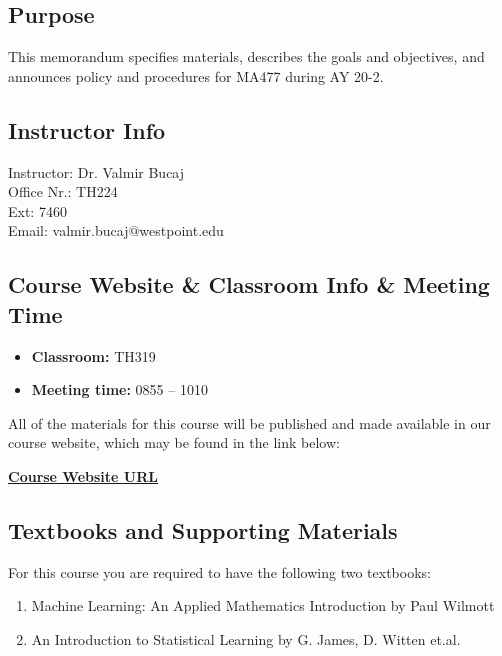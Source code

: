 \documentclass[11pt]{article}
\theoremstyle{plain}
\theoremstyle{definition}
\begin{document}
\subsection{Purpose}

This memorandum specifies materials, describes the goals and objectives, and announces policy and procedures for MA477 during AY 20-2.

\subsection{Instructor Info}

Instructor: Dr. Valmir Bucaj\\
Office Nr.: TH224\\
Ext: 7460\\
Email: valmir.bucaj$@$westpoint.edu

\subsection{Course Website \& Classroom Info \& Meeting Time}

\begin{itemize}
\item {\bf Classroom:} TH319
\item {\bf Meeting time:} 0855 -- 1010
\end{itemize}

All of the materials for this course will be published and made available in our course website, which may be found in the link below:
\vskip 12pt

\begin{center}\href{https://vbucaj.github.io/MA477-course/}{\bf Course Website URL}\end{center}


\subsection{Textbooks and Supporting Materials}

For this course you are required to have the following two textbooks:

\begin{enumerate}[(1)]
\item Machine Learning: An Applied Mathematics Introduction by Paul Wilmott
\item An Introduction to Statistical Learning by G. James, D. Witten et.al.
\end{enumerate}
\end{document}
